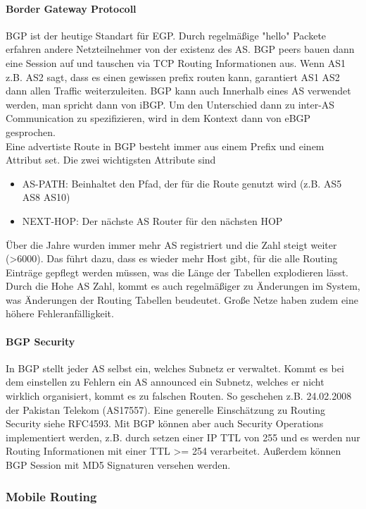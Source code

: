 			\paragraph{Border Gateway Protocoll}
				BGP ist der heutige Standart für EGP. Durch regelmäßige "hello" Packete erfahren andere Netzteilnehmer von der existenz des AS. BGP peers bauen dann eine Session auf und tauschen via TCP Routing Informationen aus. Wenn AS1 z.B. AS2 sagt, dass es einen gewissen prefix routen kann, garantiert AS1 AS2 dann allen Traffic weiterzuleiten. BGP kann auch Innerhalb eines AS verwendet werden, man spricht dann von iBGP. Um den Unterschied dann zu inter-AS Communication zu spezifizieren, wird in dem Kontext dann von eBGP gesprochen. \\
				Eine advertiste Route in BGP besteht immer aus einem Prefix und einem Attribut set. Die zwei wichtigsten Attribute sind 
				\begin{itemize}
					\item AS-PATH: Beinhaltet den Pfad, der für die Route genutzt wird (z.B. AS5 AS8 AS10)
					\item NEXT-HOP: Der nächste AS Router für den nächsten HOP
				\end{itemize}

				Über die Jahre wurden immer mehr AS registriert und die Zahl steigt weiter (>6000). Das führt dazu, dass es wieder mehr Host gibt, für die alle Routing Einträge gepflegt werden müssen, was die Länge der Tabellen explodieren lässt. Durch die Hohe AS Zahl, kommt es auch regelmäßiger zu Änderungen im System, was Änderungen der Routing Tabellen beudeutet. Große Netze haben zudem eine höhere Fehleranfälligkeit. 

				\paragraph{BGP Security}
					In BGP stellt jeder AS selbst ein, welches Subnetz er verwaltet. Kommt es bei dem einstellen zu Fehlern ein AS announced ein Subnetz, welches er nicht wirklich organisiert, kommt es zu falschen Routen. So geschehen z.B. 24.02.2008 der Pakistan Telekom (AS17557). Eine generelle Einschätzung zu Routing Security siehe RFC4593. Mit BGP können aber auch Security Operations implementiert werden, z.B. durch setzen einer IP TTL von 255 und es werden nur Routing Informationen mit einer TTL >= 254 verarbeitet. Außerdem können BGP Session mit MD5 Signaturen versehen werden.

		\subsubsection{Mobile Routing}